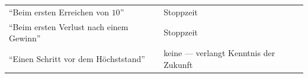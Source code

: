 \begin{merksatz}
\begin{center}
{\small
\renewcommand{\arraystretch}{1.5}
\begin{tabular}{@{}P{3.4cm}P{4.8cm}@{}}
\toprule
\enquote{Beim ersten Erreichen von $10$} & \textcolor{gruen}{Stoppzeit}\\
\enquote{Beim ersten Verlust nach einem Gewinn} & \textcolor{gruen}{Stoppzeit}\\
\enquote{Einen Schritt vor dem Höchststand} & \textcolor{akzent}{keine} --- verlangt Kenntnis der Zukunft\\
\bottomrule
\end{tabular}}
\end{center}

\begin{center}
\begin{minipage}{0.88\textwidth}
\end{minipage}
\end{center}
\end{merksatz}

